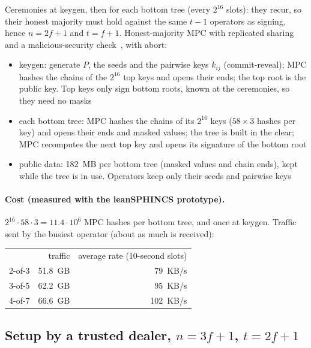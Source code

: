 \documentclass[11pt]{article}
\begin{document}
Ceremonies at keygen, then for each bottom tree (every $2^{16}$ slots): they recur, so their honest
majority must hold against the same $t-1$ operators as signing, hence $n=2f+1$ and $t=f+1$.
Honest-majority MPC with replicated sharing~\cite{CDI05} and a malicious-security check~\cite{GS20}, with
abort:
\begin{itemize}
  \item keygen: generate $P$, the seeds and the pairwise keys $k_{ij}$ (commit-reveal); MPC hashes the
        chains of the $2^{16}$ top keys and opens their ends; the top root is the public key. Top keys
        only sign bottom roots, known at the ceremonies, so they need no masks
  \item each bottom tree: MPC hashes the chains of its $2^{16}$ keys ($58\times3$ hashes per key) and
        opens their ends and masked values; the tree is built in the clear; MPC recomputes the next top
        key and opens its signature of the bottom root
  \item public data: 182~MB per bottom tree (masked values and chain ends), kept while the tree is in
        use. Operators keep only their seeds and pairwise keys
\end{itemize}

\paragraph{Cost (measured with the leanSPHINCS prototype).} $2^{16}\cdot58\cdot3=11.4\cdot10^6$ MPC hashes
per bottom tree, and once at keygen. Traffic sent by the busiest operator (about as much is received):

\begin{center}
\begin{tabular}{lrr}
  & traffic & average rate (10-second slots) \\
  2-of-3 & 51.8~GB & 79~KB/s \\
  3-of-5 & 62.2~GB & 95~KB/s \\
  4-of-7 & 66.6~GB & 102~KB/s \\
\end{tabular}
\end{center}

\subsection{\texorpdfstring{Setup by a trusted dealer, $n=3f+1$, $t=2f+1$}{Setup by a trusted dealer, n = 3f+1, t = 2f+1}}
\end{document}
